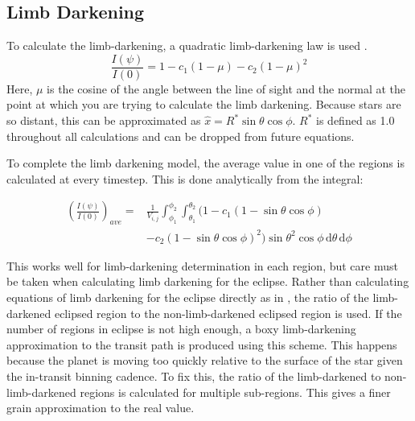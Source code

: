 

\subsection{Limb Darkening}
To calculate the limb-darkening, a quadratic limb-darkening law is used \citep{Claret2004}.
\begin{equation}
   \frac{I(\psi)}{I(0)} = 1 - c_1 (1 - \mu) - c_2 (1 - \mu)^2
\end{equation}
Here, $\mu$ is the cosine of the angle between the line of sight and the normal at the point at which you are trying to calculate the limb darkening. Because stars are so distant, this can be approximated as $\hat{x} = R^* \sin{\theta}\cos{\phi}$. $R^{*}$ is defined as 1.0 throughout all calculations and can be dropped from future equations.

To complete the limb darkening model, the average value in one of the regions is calculated at every timestep. This is done analytically from the integral:

\begin{equation}
\begin{split}
    \left(\frac{I(\psi)}{I(0)}\right)_{ave} =&  \frac{1}{V_{i,j}} \int_{\phi_1}^{\phi_2}  \int_{\theta_1}^{\theta_2}  (1 - c_1 (1 - \sin{\theta}\cos{\phi}) \\ &- c_2 (1 - \sin{\theta}\cos{\phi})^2) \sin{\theta}^2\cos{\phi}\,\mathrm{d}\theta \, \mathrm{d}\phi
\end{split}
\end{equation}

This works well for limb-darkening determination in each region, but care must be taken when calculating limb darkening for the eclipse. Rather than calculating equations of limb darkening for the eclipse directly as in \citet{MandelAgol2002}, the ratio of the limb-darkened eclipsed region to the non-limb-darkened eclipsed region is used. If the number of regions in eclipse is not high enough, a boxy limb-darkening approximation to the transit path is produced using this scheme. This happens because the planet is moving too quickly relative to the surface of the star given the in-transit binning cadence. To fix this, the ratio of the limb-darkened to non-limb-darkened regions is calculated for multiple sub-regions. This gives a finer grain approximation to the real value.

